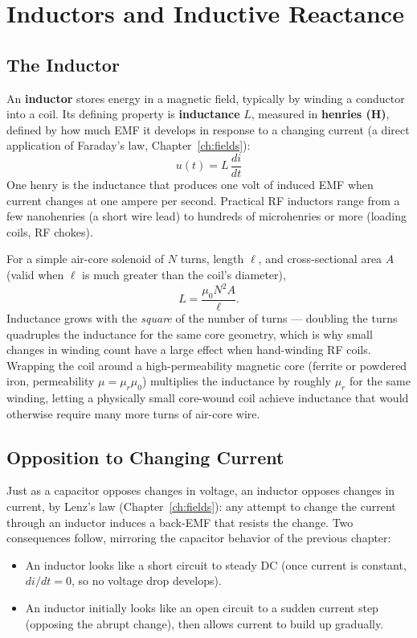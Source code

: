 \chapter{Inductors and Inductive Reactance}
\label{ch:inductors}

\section{The Inductor}

An \textbf{inductor} stores energy in a magnetic field, typically by
winding a conductor into a coil. Its defining property is
\textbf{inductance} $L$, measured in \textbf{henries (H)}, defined by
how much EMF it develops in response to a changing current (a direct
application of Faraday's law, Chapter~\ref{ch:fields}):
\[
\boxed{u(t) = L\,\frac{di}{dt}}
\]
One henry is the inductance that produces one volt of induced EMF when
current changes at one ampere per second. Practical RF inductors range
from a few nanohenries (a short wire lead) to hundreds of microhenries
or more (loading coils, RF chokes).

For a simple air-core solenoid of $N$ turns, length $\ell$, and
cross-sectional area $A$ (valid when $\ell$ is much greater than the
coil's diameter),
\[
L = \frac{\mu_0 N^2 A}{\ell}.
\]
Inductance grows with the \emph{square} of the number of turns --- doubling
the turns quadruples the inductance for the same core geometry, which is
why small changes in winding count have a large effect when
hand-winding RF coils. Wrapping the coil around a high-permeability
magnetic core (ferrite or powdered iron, permeability $\mu = \mu_r
\mu_0$) multiplies the inductance by roughly $\mu_r$ for the same
winding, letting a physically small core-wound coil achieve inductance
that would otherwise require many more turns of air-core wire.

\section{Opposition to Changing Current}

Just as a capacitor opposes changes in voltage, an inductor opposes
changes in current, by Lenz's law (Chapter~\ref{ch:fields}): any attempt
to change the current through an inductor induces a back-EMF that
resists the change. Two consequences follow, mirroring the capacitor
behavior of the previous chapter:

\begin{itemize}
\item An inductor looks like a short circuit to steady DC (once current
is constant, $di/dt = 0$, so no voltage drop develops).
\item An inductor initially looks like an open circuit to a sudden
current step (opposing the abrupt change), then allows current to build
up gradually.
\end{itemize}

